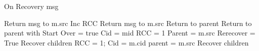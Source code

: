 \documentclass{article}
\begin{document}
\begin{algorithm}
\caption{On Recovery msg}
\label{Recovery message received}
\begin{algorithmic}[1]
		\State Return msg to m.src
		\State Inc RCC
		\State Return msg to m.src
			\State Return to parent
		\EndIf
	\Else
			\State Return to parent with Start Over = true
		\EndIf
		\State Cid = mid
		\State RCC = 1
		\State Parent = m.src
			\State Rerecover = True	
		\Else 
			\State Recover children
		\EndIf
	\EndIf
{}
	\State RCC = 1;
	\State Cid = m.cid
	\State parent = m.src
	\State Recover children
\EndIf
\EndProcedure
\end{algorithmic}
\end{algorithm}	
\end{document}
